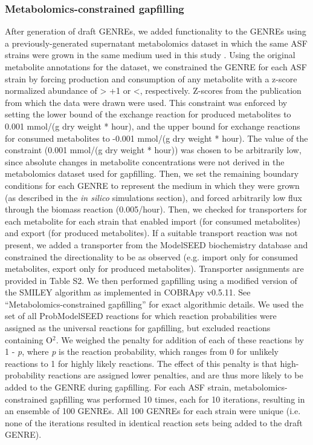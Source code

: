 \documentclass[11pt,onecolumn,notitlepage,openany,twoside]{book}
\begin{document}
\begin{refsection}
\subsubsection{Metabolomics-constrained gapfilling}

After generation of draft GENREs, we added functionality to the GENREs using a previously-generated supernatant metabolomics dataset in which the same ASF strains were grown in the same medium used in this study \cite{Biggs2017-fs}. Using the original metabolite annotations for the dataset, we constrained the GENRE for each ASF strain by forcing production and consumption of any metabolite with a z-score normalized abundance of \textgreater\! +1 or \textless{}, respectively. Z-scores from the publication from which the data were drawn were used. This constraint was enforced by setting the lower bound of the exchange reaction for produced metabolites to 0.001 mmol/(g dry weight * hour), and the upper bound for exchange reactions for consumed metabolites to -0.001 mmol/(g dry weight * hour). The value of the constraint (0.001 mmol/(g dry weight * hour)) was chosen to be arbitrarily low, since absolute changes in metabolite concentrations were not derived in the metabolomics dataset used for gapfilling. Then, we set the remaining boundary conditions for each GENRE to represent the medium in which they were grown (as described in the \textit{in silico} simulations section), and forced arbitrarily low flux through the biomass reaction (0.005/hour). Then, we checked for transporters for each metabolite for each strain that enabled import (for consumed metabolites) and export (for produced metabolites). If a suitable transport reaction was not present, we added a transporter from the ModelSEED biochemistry database and constrained the directionality to be as observed (e.g. import only for consumed metabolites, export only for produced metabolites). Transporter assignments are provided in Table S2. We then performed gapfilling using a modified version of the SMILEY algorithm \cite{Reed2006-qv} as implemented in COBRApy v0.5.11. See “Metabolomics-constrained gapfilling” for exact algorithmic details. We used the set of all ProbModelSEED reactions for which reaction probabilities were assigned as the universal reactions for gapfilling, but excluded reactions containing O$^2$. We weighed the penalty for addition of each of these reactions by 1 - \textit{p}, where \textit{p} is the reaction probability, which ranges from 0 for unlikely reactions to 1 for highly likely reactions. The effect of this penalty is that high-probability reactions are assigned lower penalties, and are thus more likely to be added to the GENRE during gapfilling. For each ASF strain, metabolomics-constrained gapfilling was performed 10 times, each for 10 iterations, resulting in an ensemble of 100 GENREs. All 100 GENREs for each strain were unique (i.e. none of the iterations resulted in identical reaction sets being added to the draft GENRE).


\end{refsection}
\end{document}
